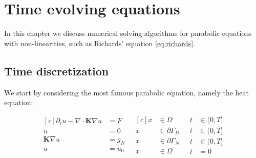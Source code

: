 \documentclass[../Main/main.tex]{subfiles}
\begin{document}
	\graphicspath{{../Time dependent equations/figs/}}
	\chapter{Time evolving equations}
	In this chapter we discuss numerical solving algorithms for parabolic equations with non-linearities, such as Richards' equation \eqref{eq:richards}. 
	\section*{Time discretization}
	We start by considering the most famous parabolic equation, namely the heat equation:
	
	\begin{equation}\label{eq:heat equation}
		\begin{aligned}[c]
			\partial_t u - \nabla \cdot \pmb{K} \nabla u &= F \\
			u &= 0 \\
			\pmb{K}\nabla u &= g_N\\
			u &= u_0
		\end{aligned}
		\ \ \
		\begin{aligned}[c]
			x &\in \Omega  \\
			x &\in \partial \Gamma_D \\
			x &\in \partial \Gamma_N \\
			x &\in \Omega  
		\end{aligned}
		\ \ \
		\begin{aligned}
			t&\in (0,T] \\
			t&\in (0,T] \\
			t&\in (0,T] \\
			t&=0
		\end{aligned}
	\end{equation}
	
\end{document}
